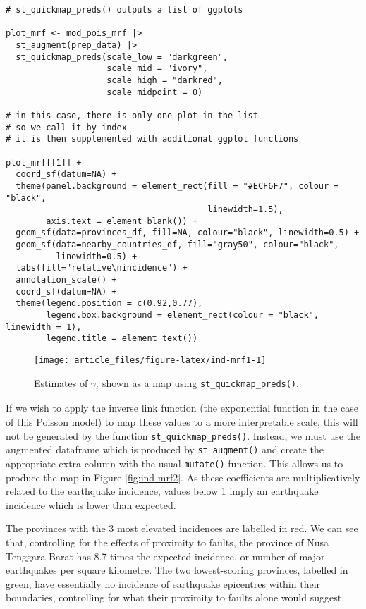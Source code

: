 \begin{verbatim}
# st_quickmap_preds() outputs a list of ggplots

plot_mrf <- mod_pois_mrf |> 
  st_augment(prep_data) |>
  st_quickmap_preds(scale_low = "darkgreen",
                    scale_mid = "ivory", 
                    scale_high = "darkred", 
                    scale_midpoint = 0)

# in this case, there is only one plot in the list
# so we call it by index
# it is then supplemented with additional ggplot functions

plot_mrf[[1]] +
  coord_sf(datum=NA) +
  theme(panel.background = element_rect(fill = "#ECF6F7", colour = "black", 
                                        linewidth=1.5),
        axis.text = element_blank()) +
  geom_sf(data=provinces_df, fill=NA, colour="black", linewidth=0.5) + 
  geom_sf(data=nearby_countries_df, fill="gray50", colour="black", 
          linewidth=0.5) + 
  labs(fill="relative\nincidence") +
  annotation_scale() +
  coord_sf(datum=NA) + 
  theme(legend.position = c(0.92,0.77),
        legend.box.background = element_rect(colour = "black", linewidth = 1),
        legend.title = element_text())
\end{verbatim}

\begin{figure}

{\centering \texttt{[image: article\_files/figure-latex/ind-mrf1-1]} 

}

\caption{Estimates of \(\gamma_i\) shown as a map using \texttt{st\_quickmap\_preds()}.}\label{fig:ind-mrf1}
\end{figure}

If we wish to apply the inverse link function (the exponential function in the case of this Poisson model) to map these values to a more interpretable scale, this will not be generated by the function \texttt{st\_quickmap\_preds()}. Instead, we must use the augmented dataframe which is produced by \texttt{st\_augment()} and create the appropriate extra column with the usual  \texttt{mutate()} function. This allows us to produce the map in Figure
\ref{fig:ind-mrf2}. As these coefficients are multiplicatively related to the earthquake incidence, values below 1 imply an earthquake incidence which is lower than expected.

The provinces with the 3 most elevated incidences are labelled in red. We can see that, controlling for the effects of proximity to faults, the province of Nusa Tenggara Barat has 8.7 times the expected incidence, or number of major earthquakes per square kilometre. The two lowest-scoring provinces, labelled in green, have essentially no incidence of earthquake epicentres within their boundaries, controlling for what their proximity to faults alone would suggest.



